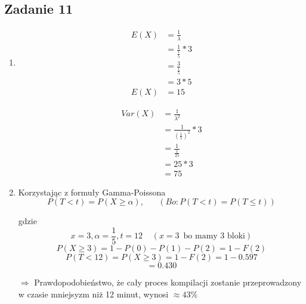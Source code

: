 \subsection{Zadanie 11}
\begin{enumerate}[label=(\alph*)]
\item

\begin{align*}
E(X) &= \frac{1}{\lambda}\\
&= \frac{1}{\frac{1}{5}} * 3\\
&= \frac{3}{\frac{1}{5}}\\
&= 3 * 5\\
E(X) &= 15
\end{align*}


\begin{align*}
Var(X) &= \frac{1}{\lambda^2}\\
&= \frac{1}{(\frac{1}{5})^2} * 3 \\
&= \frac{1}{\frac{1}{25}} \\
&= 25 * 3 \\
&= 75
\end{align*}

\item Korzystając z formuły Gamma-Poissona
$$
P(T<t) = P(X \geq \alpha), \; \; \; \; \; \; (Bo: P(T<t) = P(T \leq t))
$$

gdzie $$x = 3, \alpha = \frac{1}{5}, t=12 \;\;\;\; (x=3 \,\,\, \text{bo mamy 3 bloki})
$$
$$
P(X \geq 3) = 1 - P(0) - P(1) - P(2) = 1 - F(2)
$$
$$
P(T < 12) = P(X \geq 3) = 1 - F(2) = 1 - 0.597
$$
$$
= 0.430
$$

$\Rightarrow$ Prawdopodobieństwo, że cały proces kompilacji zostanie przeprowadzony w czasie mniejsyzm niż 12 minut, wynosi $\approx 43 \%$

\end{enumerate}
